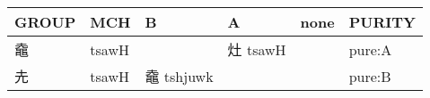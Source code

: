 \documentclass[14pt,a4paper]{scrartcl}
\begin{document}
\begin{longtable}[c]{@{}llllll@{}}
\toprule
\begin{minipage}[b]{0.14\columnwidth}\raggedright\strut
GROUP
\strut\end{minipage} &
\begin{minipage}[b]{0.14\columnwidth}\raggedright\strut
MCH
\strut\end{minipage} &
\begin{minipage}[b]{0.14\columnwidth}\raggedright\strut
B
\strut\end{minipage} &
\begin{minipage}[b]{0.14\columnwidth}\raggedright\strut
A
\strut\end{minipage} &
\begin{minipage}[b]{0.14\columnwidth}\raggedright\strut
none
\strut\end{minipage} &
\begin{minipage}[b]{0.14\columnwidth}\raggedright\strut
PURITY
\strut\end{minipage}\tabularnewline
\midrule
\endhead
\begin{minipage}[t]{0.14\columnwidth}\raggedright\strut
鼀
\strut\end{minipage} &
\begin{minipage}[t]{0.14\columnwidth}\raggedright\strut
tsawH
\strut\end{minipage} &
\begin{minipage}[t]{0.14\columnwidth}\raggedright\strut
\strut\end{minipage} &
\begin{minipage}[t]{0.14\columnwidth}\raggedright\strut
灶 tsawH
\strut\end{minipage} &
\begin{minipage}[t]{0.14\columnwidth}\raggedright\strut
\strut\end{minipage} &
\begin{minipage}[t]{0.14\columnwidth}\raggedright\strut
pure:A
\strut\end{minipage}\tabularnewline
\begin{minipage}[t]{0.14\columnwidth}\raggedright\strut
圥
\strut\end{minipage} &
\begin{minipage}[t]{0.14\columnwidth}\raggedright\strut
tsawH
\strut\end{minipage} &
\begin{minipage}[t]{0.14\columnwidth}\raggedright\strut
鼀 tshjuwk
\strut\end{minipage} &
\begin{minipage}[t]{0.14\columnwidth}\raggedright\strut
\strut\end{minipage} &
\begin{minipage}[t]{0.14\columnwidth}\raggedright\strut
\strut\end{minipage} &
\begin{minipage}[t]{0.14\columnwidth}\raggedright\strut
pure:B
\strut\end{minipage}\tabularnewline
\bottomrule
\end{longtable}
\end{document}
